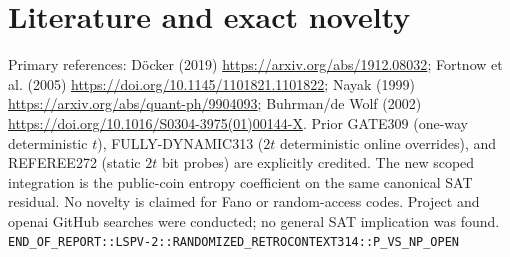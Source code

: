 \documentclass[11pt]{article}
\begin{document}
\section{Literature and exact novelty}
Primary references: D\"ocker (2019) \url{https://arxiv.org/abs/1912.08032}; Fortnow et al. (2005) \url{https://doi.org/10.1145/1101821.1101822}; Nayak (1999) \url{https://arxiv.org/abs/quant-ph/9904093}; Buhrman/de Wolf (2002) \url{https://doi.org/10.1016/S0304-3975(01)00144-X}. Prior GATE309 (one-way deterministic $t$), FULLY-DYNAMIC313 ($2t$ deterministic online overrides), and REFEREE272 (static $2t$ bit probes) are explicitly credited. The new scoped integration is the public-coin entropy coefficient on the same canonical SAT residual. No novelty is claimed for Fano or random-access codes. Project and openai GitHub searches were conducted; no general SAT implication was found.
\noindent\texttt{END\_OF\_REPORT::LSPV-2::RANDOMIZED\_RETROCONTEXT314::P\_VS\_NP\_OPEN}
\end{document}
